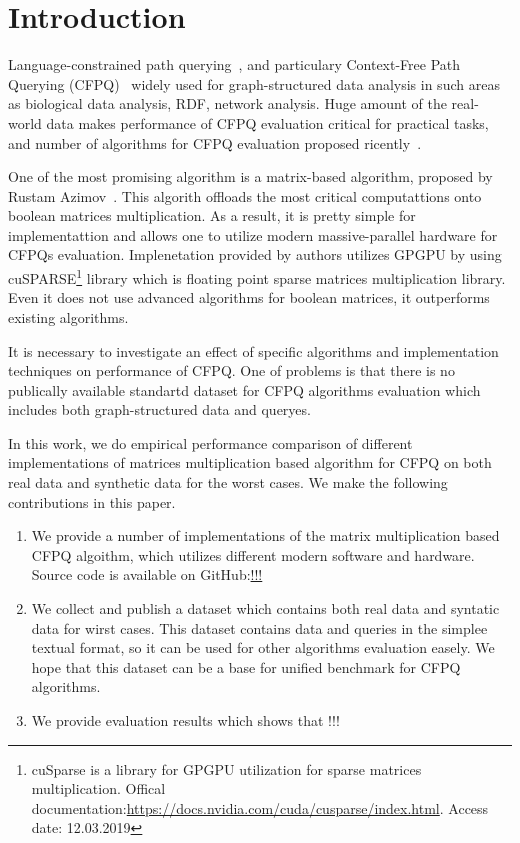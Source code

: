 \section{Introduction}

Language-constrained path querying~\cite{FLCpathProblem}, and particulary Context-Free Path Querying (CFPQ)~\cite{Yannakakis} widely used for graph-structured data analysis in such areas as biological data analysis, RDF, network analysis.
Huge amount of the real-world data makes performance of CFPQ evaluation critical for practical tasks, and number of algorithms for CFPQ evaluation proposed ricently~\cite{hellingsPathQuerying,Grigorev:2017:CPQ:3166094.3166104,Verbitskaia:2018:PCC:3241653.3241655,RDF,10.1007/978-3-319-91662-0_17,Medeiros:2018:EEC:3167132.3167265}.

One of the most promising algorithm is a matrix-based algorithm, proposed by Rustam Azimov~\cite{Azimov:2018:CPQ:3210259.3210264}.
This algorith offloads the most critical computattions onto boolean matrices multiplication.
As a result, it is pretty simple for implementattion and allows one to utilize modern massive-parallel hardware for CFPQs evaluation.
Implenetation provided by authors utilizes GPGPU by using cuSPARSE\footnote{cuSparse is a library for GPGPU utilization for sparse matrices multiplication. Offical documentation:\url{https://docs.nvidia.com/cuda/cusparse/index.html}. Access date: 12.03.2019} library which is floating point sparse matrices multiplication library.
Even it does not use advanced algorithms for boolean matrices, it outperforms existing algorithms.

It is necessary to investigate an effect of specific algorithms and implementation techniques on performance of CFPQ.
One of problems is that there is no publically available standartd dataset for CFPQ algorithms evaluation which includes both graph-structured data and queryes.

In this work, we do empirical performance comparison of different implementations of matrices multiplication based algorithm for CFPQ on both real data and synthetic data for the worst cases.
We make the following contributions in this paper.

\begin{enumerate}
\item We provide a number of implementations of the matrix multiplication based CFPQ algoithm, which utilizes different modern software and hardware. 
Source code is available on GitHub:\url{!!!}
\item We collect and publish a dataset which contains both real data and syntatic data for wirst cases.
This dataset contains data and queries in the simplee textual format, so it can be used for other algorithms evaluation easely.
We hope that this dataset can be a base for unified benchmark for CFPQ algorithms.
\item We provide evaluation results which shows that !!!
\end{enumerate}
